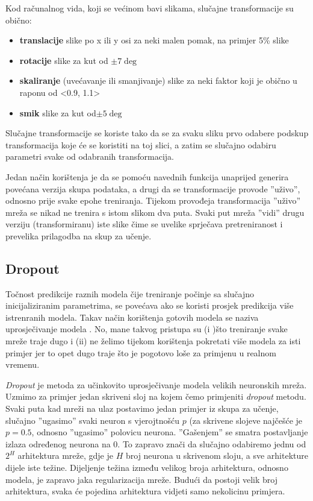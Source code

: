 \documentclass[times, utf8, diplomski, numeric]{fer}
\begin{document}
Kod računalnog vida, koji se većinom bavi slikama, slučajne transformacije su obično:
\begin{itemize}
  \item
  	\textbf{translacije} slike po x ili y osi za neki malen pomak, na primjer 5\% slike
  \item
    \textbf{rotacije} slike za kut od $\pm 7\deg$
  \item
  	\textbf{skaliranje} (uvećavanje ili smanjivanje) slike za neki faktor koji je obično u raponu od <0.9, 1.1>
  \item
    \textbf{smik} slike za kut od$\pm 5\deg$
\end{itemize}

Slučajne transformacije se koriste tako da se za svaku sliku prvo odabere podskup transformacija koje će se koristiti na toj slici, a zatim se slučajno odabiru parametri svake od odabranih transformacija.

Jedan način korištenja je da se pomoću navednih funkcija unaprijed generira povećana verzija skupa podataka, a drugi da se transformacije provode ''uživo'', odnosno prije svake epohe treniranja. Tijekom provođeja transformacija ''uživo'' mreža se nikad ne trenira s istom slikom dva puta. Svaki put mreža ''vidi'' drugu verziju (transformiranu) iste slike čime se uvelike sprječava pretreniranost i prevelika prilagodba na skup za učenje.

\subsection{Dropout}

Točnost predikcije raznih modela čije treniranje počinje sa slučajno inicijaliziranim parametrima, se povećava ako se koristi prosjek predikcija više istrenranih modela. Takav način korištenja gotovih modela se naziva uprosječivanje modela . No, mane takvog pristupa su (i )što treniranje svake mreže traje dugo i (ii) ne želimo tijekom korištenja pokretati više modela za isti primjer jer to opet dugo traje što je pogotovo loše za primjenu u realnom vremenu.

\emph{Dropout} je metoda za učinkovito uprosječivanje modela velikih neuronskih mreža\cite{hinton_dropout}. Uzmimo za primjer jedan skriveni sloj na kojem čemo primjeniti \emph{dropout} metodu. Svaki puta kad mreži na ulaz postavimo jedan primjer iz skupa za učenje, slučajno ''ugasimo'' svaki neuron s vjerojtnošću $p$ (za skrivene slojeve najčešće je $p = 0.5$, odnosno ''ugasimo'' polovicu neurona. ''Gašenjem'' se smatra postavljanje izlaza određenog neurona na 0. To zapravo znači da slučajno odabiremo jednu od $2^H$ arhitektura mreže, gdje je $H$ broj neurona u skrivenom sloju, a sve arhitekture dijele iste težine. Dijeljenje težina između velikog broja arhitektura, odnosno modela, je zapravo jaka regularizacija mreže. Budući da postoji velik broj arhitektura, svaka će pojedina arhitektura vidjeti samo nekolicinu primjera.
\end{document}
